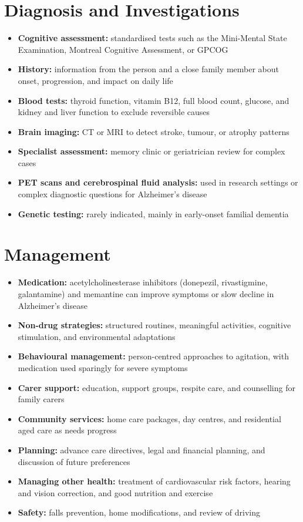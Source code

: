 \section*{Diagnosis and Investigations}
\begin{itemize}
    \item \textbf{Cognitive assessment:} standardised tests such as the Mini-Mental State Examination, Montreal Cognitive Assessment, or GPCOG
    \item \textbf{History:} information from the person and a close family member about onset, progression, and impact on daily life
    \item \textbf{Blood tests:} thyroid function, vitamin B12, full blood count, glucose, and kidney and liver function to exclude reversible causes
    \item \textbf{Brain imaging:} CT or MRI to detect stroke, tumour, or atrophy patterns
    \item \textbf{Specialist assessment:} memory clinic or geriatrician review for complex cases
    \item \textbf{PET scans and cerebrospinal fluid analysis:} used in research settings or complex diagnostic questions for Alzheimer's disease
    \item \textbf{Genetic testing:} rarely indicated, mainly in early-onset familial dementia
\end{itemize}

\section*{Management}
\begin{itemize}
    \item \textbf{Medication:} acetylcholinesterase inhibitors (donepezil, rivastigmine, galantamine) and memantine can improve symptoms or slow decline in Alzheimer's disease
    \item \textbf{Non-drug strategies:} structured routines, meaningful activities, cognitive stimulation, and environmental adaptations
    \item \textbf{Behavioural management:} person-centred approaches to agitation, with medication used sparingly for severe symptoms
    \item \textbf{Carer support:} education, support groups, respite care, and counselling for family carers
    \item \textbf{Community services:} home care packages, day centres, and residential aged care as needs progress
    \item \textbf{Planning:} advance care directives, legal and financial planning, and discussion of future preferences
    \item \textbf{Managing other health:} treatment of cardiovascular risk factors, hearing and vision correction, and good nutrition and exercise
    \item \textbf{Safety:} falls prevention, home modifications, and review of driving
\end{itemize}

